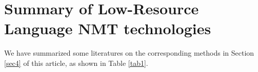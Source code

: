 \documentclass[acmsmall]{acmart}
\begin{document}






\section{Summary of Low-Resource Language NMT technologies}
\label{sec6}
We have summarized some literatures on the corresponding methods in Section \ref{sec4} of this article, as shown in Table \ref{tab1}.
\end{document}
